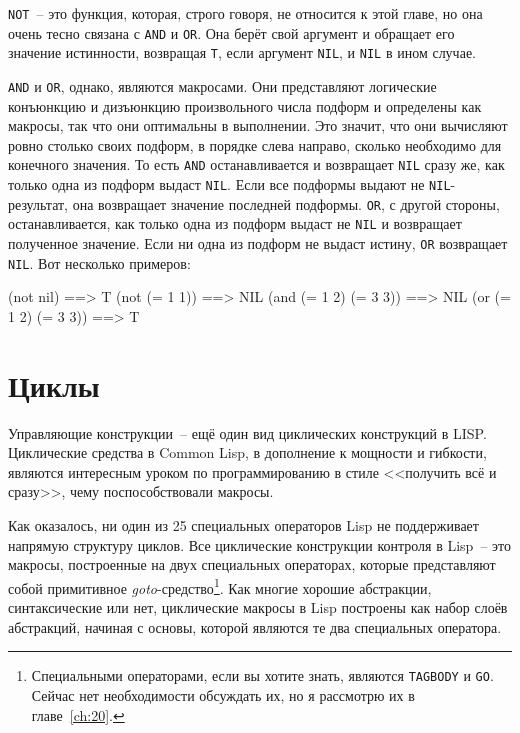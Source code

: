 \lstinline{NOT}~-- это функция, которая, строго говоря, не относится к этой главе, но она очень
тесно связана с \lstinline{AND} и \lstinline{OR}. Она берёт свой аргумент и обращает его значение
истинности, возвращая \lstinline{T}, если аргумент \lstinline{NIL}, и \lstinline{NIL} в ином случае.

\lstinline{AND} и \lstinline{OR}, однако, являются макросами. Они представляют логические конъюнкцию
и дизъюнкцию произвольного числа подформ и определены как макросы, так что они оптимальны
в выполнении. Это значит, что они вычисляют ровно столько своих подформ, в порядке слева
направо, сколько необходимо для конечного значения. То есть \lstinline{AND} останавливается и
возвращает \lstinline{NIL} сразу же, как только одна из подформ выдаст \lstinline{NIL}. Если все
подформы выдают не \lstinline{NIL}-результат, она возвращает значение последней
подформы. \lstinline{OR}, с другой стороны, останавливается, как только одна из подформ выдаст
не \lstinline{NIL} и возвращает полученное значение. Если ни одна из подформ не выдаст истину,
\lstinline{OR} возвращает \lstinline{NIL}. Вот несколько примеров:

\begin{myverb}
(not nil)             ==> T
(not (= 1 1))         ==> NIL
(and (= 1 2) (= 3 3)) ==> NIL
(or (= 1 2) (= 3 3))  ==> T
\end{myverb}

\section{Циклы}

Управляющие конструкции~-- ещё один вид циклических конструкций в LISP. Циклические средства в Common Lisp, в дополнение к
мощности и гибкости, являются интересным уроком по программированию в стиле <<получить всё
и сразу>>, чему поспособствовали макросы.

Как оказалось, ни один из 25 специальных операторов Lisp не поддерживает напрямую
структуру циклов. Все циклические конструкции контроля в Lisp~-- это макросы, построенные
на двух специальных операторах, которые представляют собой примитивное
\textit{goto}-средство\footnote{Специальными операторами, если вы хотите знать, являются
  \lstinline{TAGBODY} и \lstinline{GO}. Сейчас нет необходимости обсуждать их, но я рассмотрю их в
  главе~\ref{ch:20}.}.  Как многие хорошие абстракции, синтаксические или нет, циклические
макросы в Lisp построены как набор слоёв абстракций, начиная с основы, которой являются те
два специальных оператора.

